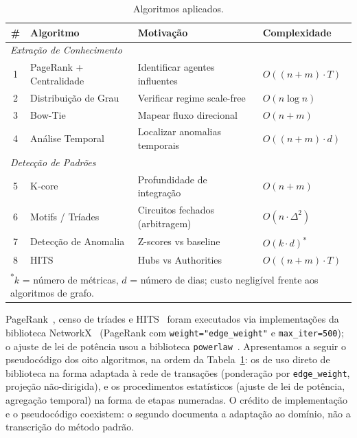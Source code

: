 \documentclass[12pt,a4paper]{article}
\begin{document}
\begin{table}[H]
\centering
\caption{Algoritmos aplicados.}
\label{tab:algoritmos}
\small
\begin{tabular}{clll}
\toprule
\# & Algoritmo & Motivação & Complexidade \\
\midrule
\multicolumn{4}{l}{\textit{Extração de Conhecimento}} \\
1 & PageRank + Centralidade & Identificar agentes influentes & $O((n+m) \cdot T)$ \\
2 & Distribuição de Grau    & Verificar regime scale-free    & $O(n \log n)$ \\
3 & Bow-Tie                 & Mapear fluxo direcional        & $O(n+m)$ \\
4 & Análise Temporal         & Localizar anomalias temporais  & $O((n+m) \cdot d)$ \\
\midrule
\multicolumn{4}{l}{\textit{Detecção de Padrões}} \\
5 & K-core                  & Profundidade de integração     & $O(n+m)$ \\
6 & Motifs / Tríades        & Circuitos fechados (arbitragem)& $O(n \cdot \Delta^2)$ \\
7 & Detecção de Anomalia    & Z-scores vs baseline           & $O(k \cdot d)$\textsuperscript{*} \\
8 & HITS                    & Hubs vs Authorities            & $O((n+m) \cdot T)$ \\
\bottomrule
\multicolumn{4}{l}{\footnotesize \textsuperscript{*}$k$ = número de métricas, $d$ = número de dias; custo negligível frente aos algoritmos de grafo.}
\end{tabular}
\end{table}

PageRank~\cite{page1999}, censo de tríades e HITS~\cite{kleinberg1999} foram executados via implementações da biblioteca NetworkX~\cite{networkx} (PageRank com \texttt{weight="edge\_weight"} e \texttt{max\_iter=500}); o ajuste de lei de potência usou a biblioteca \texttt{powerlaw}~\cite{alstott2014}. Apresentamos a seguir o pseudocódigo dos oito algoritmos, na ordem da Tabela~\ref{tab:algoritmos}: os de uso direto de biblioteca na forma adaptada à rede de transações (ponderação por \texttt{edge\_weight}, projeção não-dirigida), e os procedimentos estatísticos (ajuste de lei de potência, agregação temporal) na forma de etapas numeradas. O crédito de implementação e o pseudocódigo coexistem: o segundo documenta a adaptação ao domínio, não a transcrição do método padrão.
\end{document}
